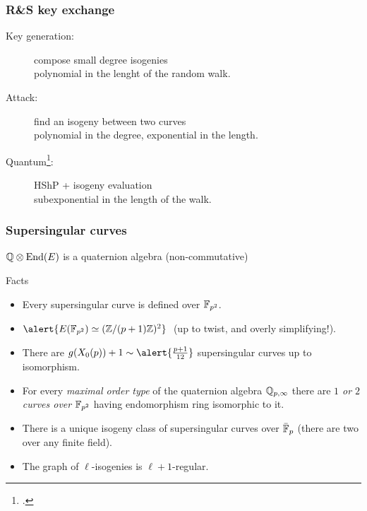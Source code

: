 \documentclass{beamer}
\begin{document}

\begin{frame}
  \frametitle{R\&S key exchange}

  \begin{center}
  \end{center}

  \begin{description}
  \item[Key generation:] compose small degree
    isogenies\\\alert{polynomial in the lenght of the random walk}.
  \item[Attack:] find an isogeny between two curves\\\alert{polynomial
      in the degree, exponential in the length}.
  \item[Quantum\footcite{childs+jao+soukharev10}:] HShP + isogeny
    evaluation\\\alert{subexponential in the length of the walk}.
  \end{description}
\end{frame}


\begin{frame}
  \frametitle{Supersingular curves}

  \emph{$\mathbb{Q}\otimes\operatorname{End}(E)$} is a quaternion algebra (non-commutative)

  \begin{block}{Facts}
    \begin{itemize}
    \item Every supersingular curve is defined over \alert{$\mathbb{F}_{p^2}$}.
    \item $\alert{E(\F_{p^2}) \simeq (\Z/(p+1)\Z)^2}\;$ (up to twist, and overly simplifying!).
    \item There are $g(X_0(p))+1 \sim\alert{\frac{p+1}{12}}$ supersingular curves
      up to isomorphism.
    \item For every \emph{maximal order type} of the quaternion
      algebra $\mathbb{Q}_{p,\infty}$ there are \emph{$1$ or $2$ curves over
        $\mathbb{F}_{p^2}$} having endomorphism ring isomorphic to it.
    \item There is a \alert{unique isogeny class} of supersingular
      curves over $\bar{\mathbb{F}}_p$ (there are two over any finite field).
    \item The graph of \emph{$\ell$}-isogenies is
      \emph{$\ell+1$}-regular.
    \end{itemize}
  \end{block}
\end{frame}
\end{document}
